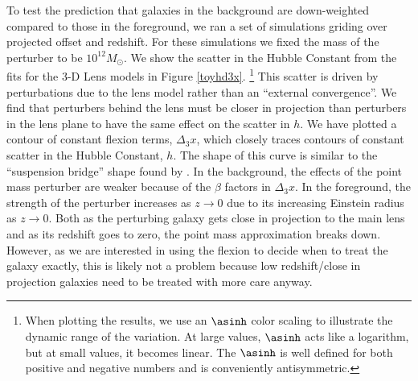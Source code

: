 To test the prediction that galaxies in the background are down-weighted compared to those in the foreground, we ran a set of simulations griding over projected offset and redshift. For these simulations we fixed the mass of the perturber to be $10^{12} M_\odot$. We show the scatter in the Hubble Constant from the fits for the 3-D Lens models in Figure \ref{toyhd3x}. \footnote{When plotting the results, we use an $\asinh$ color scaling to illustrate the dynamic range of the variation. At large values, $\asinh$ acts like a logarithm, but at small values, it becomes linear. The $\asinh$ is well defined for both positive and negative numbers and is conveniently antisymmetric.} This scatter is driven by perturbations due to the lens model rather than an ``external convergence''. We find that perturbers behind the lens must be closer in projection than perturbers in the lens plane to have the same effect on the scatter in $h$. We have plotted a contour of constant flexion terms, $\Delta_3 x$, which closely traces contours of constant scatter in the Hubble Constant, $h$. The shape of this curve is similar to the ``suspension bridge'' shape found by \citet{Momcheva06}. In the background, the effects of the point mass perturber are weaker because of the $\beta$ factors in $\Delta_3 x$. In the foreground, the strength of the perturber increases as $z \rightarrow 0$ due to its increasing Einstein radius as $z \rightarrow 0$. Both as the perturbing galaxy gets close in projection to the main lens and as its redshift goes to zero, the point mass approximation breaks down. However, as we are interested in using the flexion to decide when to treat the galaxy exactly, this is likely not a problem because low redshift/close in projection galaxies need to be treated with more care anyway. 